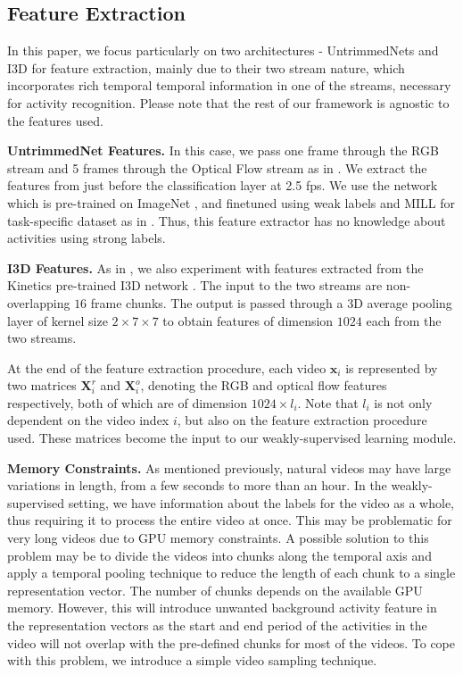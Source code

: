 \documentclass[runningheads]{llncs}
\begin{document}
\subsection{Feature Extraction}
\label{feature}
In this paper, we focus particularly on two architectures - UntrimmedNets \cite{wang2017untrimmednets} and I3D \cite{carreira2017quo} for feature extraction, mainly due to their two stream nature, which incorporates rich temporal temporal information in one of the streams, necessary for activity recognition. Please note that the rest of our framework is agnostic to the features used.

\textbf{UntrimmedNet Features.} In this case, we pass one frame through the RGB stream and 5 frames through the Optical Flow stream as in \cite{wang2017untrimmednets}. We extract the features from just before the classification layer at 2.5 fps. We use the network which is pre-trained on ImageNet \cite{deng2009imagenet}, and finetuned using weak labels and MILL for task-specific dataset as in \cite{wang2017untrimmednets}. Thus, this feature extractor has no knowledge about activities using strong labels. 

\textbf{I3D Features.} As in \cite{nguyen2017weakly}, we also experiment with features extracted from the Kinetics pre-trained I3D network \cite{carreira2017quo}. The input to the two streams are non-overlapping $16$ frame chunks. The output is passed through a 3D average pooling layer of kernel size $2 \times 7 \times 7$ to obtain features of dimension $1024$ each from the two streams. 

At the end of the feature extraction procedure, each video $\boldsymbol{x}_i$ is represented by two matrices $\boldsymbol{X}^r_i$ and $\boldsymbol{X}^o_i$, denoting the RGB and optical flow features respectively, both of which are of dimension $1024 \times l_i$. Note that $l_i$ is not only dependent on the video index $i$, but also on the feature extraction procedure used. These matrices become the input to our weakly-supervised learning module.

\textbf{Memory Constraints.} As mentioned previously, natural videos may have large variations in length, from a few seconds to more than an hour. In the weakly-supervised setting, we have information about the labels for the video as a whole, thus requiring it to process the entire video at once. This may be problematic for very long videos due to GPU memory constraints. A possible solution to this problem may be to divide the videos into chunks along the temporal axis \cite{wang2016temporal} and apply a temporal pooling technique to reduce the length of each chunk to a single representation vector. The number of chunks depends on the available GPU memory. However, this will introduce unwanted background activity feature in the representation vectors as the start and end period of the activities in the video will not overlap with the pre-defined chunks for most of the videos. To cope with this problem, we introduce a simple video sampling technique.
\end{document}
